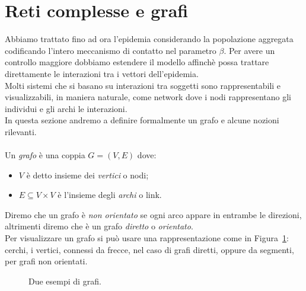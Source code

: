 \section{Reti complesse e grafi}\label{grafi}
Abbiamo trattato fino ad ora l'epidemia considerando la popolazione aggregata codificando l'intero meccanismo di contatto nel parametro $\beta$. Per avere un controllo maggiore dobbiamo estendere il modello affinch\`e possa trattare direttamente le interazioni tra i vettori dell'epidemia.\\
Molti sistemi che si basano su interazioni tra soggetti sono rappresentabili e visualizzabili, in maniera naturale, come network dove i nodi rappresentano gli individui e gli archi le interazioni.\\
In questa sezione andremo a definire formalmente un grafo e alcune nozioni rilevanti.\\ \\
Un \textit{grafo} \`e una coppia $G=(V,	E) $ dove:
\begin{itemize}
	\item $V$ \`e detto  insieme dei \textit{vertici} o nodi;
	\item $E\subseteq V \times V$ \`e l'insieme degli \textit{archi} o link.
\end{itemize}
Diremo che un grafo \`e \textit{non orientato} se ogni arco appare in entrambe le direzioni, altrimenti diremo che \`e un grafo \textit{diretto} o \textit{orientato}.\\
Per visualizzare un grafo si pu\`o usare una rappresentazione come in Figura~\ref{fig::esegrafi}: cerchi, i vertici, connessi da frecce, nel caso di grafi diretti, oppure da segmenti, per grafi non orientati. 
\begin{figure}[ht]
\centering
{}  \hfill
{}
\caption{Due esempi di grafi.}
\label{fig::esegrafi}
\end{figure}


